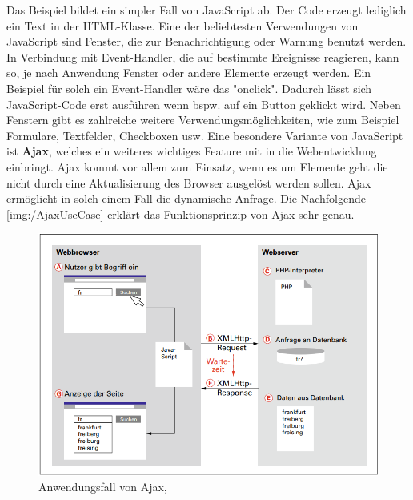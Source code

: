 \documentclass[a4paper,titlepage,halfparskip,12pt]{scrreprt}
\begin{document}
\begin{onehalfspacing}
Das Beispiel bildet ein simpler Fall von JavaScript ab. Der Code erzeugt lediglich ein Text in der HTML-Klasse. Eine der beliebtesten Verwendungen von JavaScript sind Fenster, die zur Benachrichtigung oder Warnung benutzt werden. In Verbindung mit Event-Handler, die auf bestimmte Ereignisse reagieren, kann so, je nach Anwendung Fenster oder andere Elemente erzeugt werden. Ein Beispiel für solch ein Event-Handler wäre das "onclick". Dadurch lässt sich JavaScript-Code erst ausführen wenn bspw. auf ein Button geklickt wird. Neben Fenstern gibt es zahlreiche weitere Verwendungsmöglichkeiten, wie zum Beispiel Formulare, Textfelder, Checkboxen usw. Eine besondere Variante von JavaScript ist \textbf{\ac{Ajax}}, welches ein weiteres wichtiges Feature mit in die Webentwicklung einbringt. \ac{Ajax} kommt vor allem zum Einsatz, wenn es um Elemente geht die nicht durch eine Aktualisierung des Browser ausgelöst werden sollen. \ac{Ajax} ermöglicht in solch einem Fall die dynamische Anfrage. Die Nachfolgende \autoref{img:/AjaxUseCase} erklärt das Funktionsprinzip von \ac{Ajax} sehr genau.
\begin{figure}[h]
	\centering
	\includegraphics[scale=1.0]{images/AjaxUseCase}
	\caption{Anwendungsfall von Ajax, \cite{buhler2018webtechnologien}} 
	\label{img:/AjaxUseCase}
\end{figure}

\end{onehalfspacing}
\end{document}
